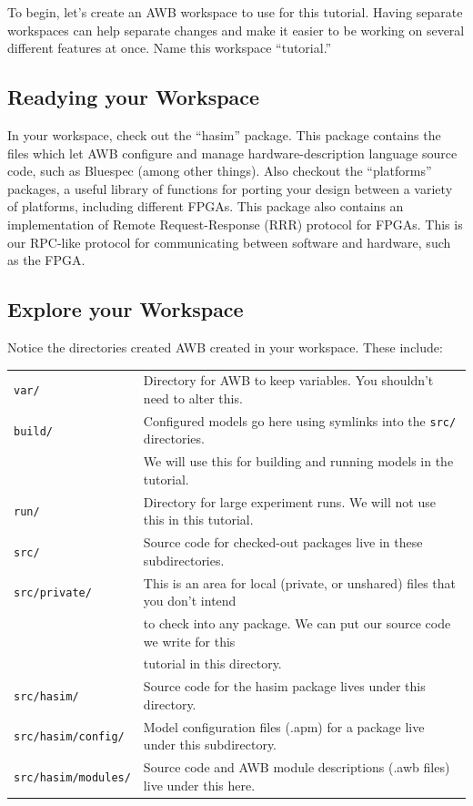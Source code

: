 \documentclass{article}
\begin{document}
To begin, let's create an AWB workspace to use for this tutorial. Having separate workspaces can help separate changes and make it easier to be working on several
different features at once. Name this workspace ``tutorial.''

\subsection{Readying your Workspace}

In your workspace, check out the ``hasim'' package. This package contains the files which let AWB configure and manage hardware-description language source code,
such as Bluespec (among other things). Also checkout the ``platforms'' packages, a useful library of functions for porting your design between a variety of
platforms, including different FPGAs. This package also contains an implementation of Remote Request-Response (RRR) protocol for FPGAs. This is our RPC-like
protocol for communicating between software and hardware, such as the FPGA.

\subsection{Explore your Workspace}

Notice the directories created AWB created in your workspace. These include:

\vspace{10pt}
\begin{tabular}{ll}
    \texttt{var/}                    & Directory for AWB to keep variables. You shouldn't need to alter this. \\
    \texttt{build/}                  & Configured models go here using symlinks into the \texttt{src/} directories.\\
                                     & We will use this for building and running models in the tutorial. \\
    \texttt{run/}                    & Directory for large experiment runs. We will not use this in this tutorial.\\
    \texttt{src/}                    & Source code for checked-out packages live in these subdirectories. \\
    \texttt{src/private/}            & This is an area for local (private, or unshared) files that you don't intend \\
                                     & to check into any package. We can put our source code we write for this \\
                                     & tutorial in this directory. \\
    \texttt{src/hasim/}              & Source code for the hasim package lives under this directory. \\
    \texttt{src/hasim/config/}       & Model configuration files (.apm) for a package live under this subdirectory. \\
    \texttt{src/hasim/modules/}      & Source code and AWB module descriptions (.awb files) live under this here. \\
\end{tabular}
\end{document}

